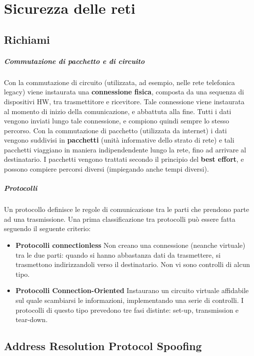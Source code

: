 \chapter{Sicurezza delle reti}
\section{Richiami}
\paragraph{Commutazione di pacchetto e di circuito}
Con la commutazione di circuito (utilizzata, ad esempio, nelle rete telefonica legacy) viene instaurata una \textbf{connessione fisica}, composta da una sequenza di dispositivi HW, tra trasmettitore e ricevitore. Tale connessione viene instaurata al momento di inizio della comunicazione, e abbattuta alla fine. Tutti i dati vengono inviati lungo tale connessione, e compiono quindi sempre lo stesso percorso.
\newline \newline
Con la commutazione di pacchetto (utilizzata da internet) i dati vengono suddivisi in \textbf{pacchetti} (unità informative dello strato di rete) e tali pacchetti viaggiano in maniera indipendendente lungo la rete, fino ad arrivare al destinatario. I pacchetti vengono trattati secondo il principio del \textbf{best effort}, e possono compiere percorsi diversi (impiegando anche tempi diversi).
\paragraph{Protocolli}
Un protocollo definisce le regole di comunicazione tra le parti che prendono parte ad una trasmissione. Una prima classificazione tra protocolli può essere fatta seguendo il seguente criterio:
\begin{itemize}
\item \textbf{Protocolli connectionless} Non creano una connessione (neanche virtuale) tra le due parti: quando si hanno abbastanza dati da trasmettere, si trasmettono indirizzandoli verso il destinatario. Non vi sono controlli di alcun tipo.
\item \textbf{Protocolli Connection-Oriented} Instaurano un circuito virtuale affidabile sul quale scambiarsi le informazioni, implementando una serie di controlli. I protocolli di questo tipo prevedono  tre fasi distinte: set-up, transmission e tear-down.
\end{itemize}

\section{Address Resolution Protocol Spoofing}

